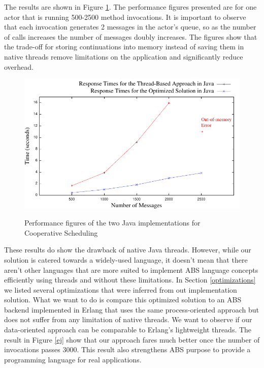 \par The results are shown in Figure \ref{jj}. The performance figures presented are for one actor that is running 500-2500 method invocations. It is important to observe that each invocation generates 2 messages in the actor's queue, so as the number of calls increases the number of messages doubly increases. The figures show that the trade-off for storing continuations into memory instead of saving them in native threads remove limitations on the application and significantly reduce overhead.


\begin{figure}
	\caption{Performance figures of the two Java implementations for Cooperative Scheduling}
	\centering
	\includegraphics[scale=0.8]{jaj8.pdf}
	\label{jj}
\end{figure}

\par These results do show the drawback of native Java threads. However, while our solution is catered towards a widely-used language, it doesn't mean that there aren't other languages that are more suited to implement ABS language concepts efficiently using threads and without these limitations. In Section \ref{optimizations} we listed several optimizations that were inferred from out implementation solution. What we want to do is compare this optimized solution to an ABS backend implemented in Erlang that uses the same process-oriented approach but does not suffer from any limitation of native threads. We want to observe if our data-oriented approach can be comparable to Erlang's lightweight threads. The result in Figure \ref{ej} show that our approach fares much better once the number of invocations passes 3000. This result also strengthens ABS purpose to provide a programming language for real applications.

